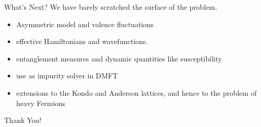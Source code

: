 \documentclass[aspectratio=169]{beamer}
\begin{document}
\begin{frame}{What's Next?}
We have barely scratched the surface of the problem.
\vspace{10pt}
\begin{itemize} 
\item Asymmetric model and valence fluctuations
	\vspace{10pt}
\item effective Hamiltonians and wavefunctions.
	\vspace{10pt}
\item entanglement measures and dynamic quantities like susceptibility
	\vspace{10pt}
\item use as impurity solver in DMFT
	\vspace{10pt}
\item extensions to the Kondo and Anderson lattices, and hence to the problem of heavy Fermions
\end{itemize}
\end{frame}
\begin{frame}
	\LARGE \centering Thank You!
\end{frame}
\end{document}

